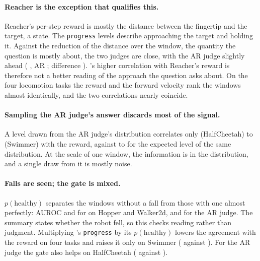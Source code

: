 \paragraph{Reacher is the exception that qualifies this.} Reacher's per-step reward is mostly the distance between the
fingertip and the target, a state. The \texttt{progress} levels describe approaching the target and holding it. Against
the reduction of the distance over the window, the quantity the question is mostly about, the two judges are close, with
the AR judge slightly ahead (\kev{} , AR ; difference
). \kev{}'s
higher correlation with Reacher's reward is therefore not a better reading of the approach the question asks about.
On the four locomotion tasks the reward and the forward velocity rank the windows almost identically, and the two
correlations nearly coincide.

\paragraph{Sampling the AR judge's answer discards most of the signal.} A level drawn from the AR judge's distribution
correlates only  (HalfCheetah) to  (Swimmer)
with the reward, against  to  for the expected level of the
same distribution. At the scale of one window, the information is in the distribution, and a single draw from it is
mostly noise.

\paragraph{Falls are seen; the gate is mixed.} $p(\text{healthy})$ separates the windows without a fall from those with
one almost perfectly: AUROC  and  for \kev{} on Hopper and
Walker2d,  and  for the AR judge. The summary states whether the
robot fell, so this checks reading rather than judgment. Multiplying \kev{}'s \texttt{progress} by its
$p(\text{healthy})$ lowers the agreement with the reward on four tasks and raises it only on Swimmer
( against ). For the AR judge the gate also helps on
HalfCheetah ( against ).

